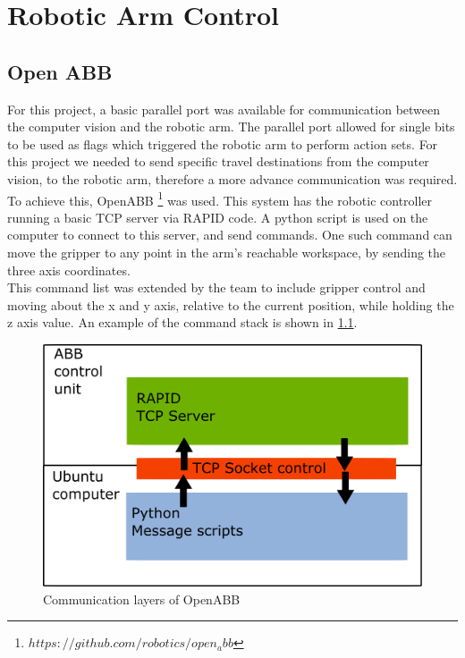 \documentclass[11pt,a4paper, margin=1in]{report}
\begin{document}
\chapter{Robotic Arm Control}

\section{Open ABB}
For this project, a basic parallel port was available for communication between the computer vision and the robotic arm. The parallel port allowed for single bits to be used as flags which triggered the robotic arm to perform action sets. For this project we needed to send specific travel destinations from the computer vision, to the robotic arm, therefore a more advance communication was required. To achieve this, OpenABB \footnote{$https://github.com/robotics/open_abb$} was used. This system has the robotic controller running a basic TCP server via RAPID code. A python script is used on the computer to connect to this server, and send commands. One such command can move the gripper to any point in the arm's reachable workspace, by sending the three axis coordinates.\\
This command list was extended by the team to  include gripper control and moving about the x and y axis, relative to the current position, while holding the z axis value. 
An example of the command stack is shown in \cref{fig:commstack1}.
\begin{figure}[h]
\centering
\includegraphics[width=0.5\linewidth]{commstack1}
\caption{Communication layers of OpenABB}
\label{fig:commstack1}
\end{figure}
\end{document}
